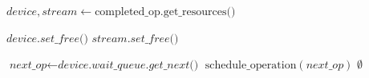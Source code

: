 \begin{algorithm}
\vspace{0.5cm}

\begin{algorithmic}[1]
    \State $\textit{device}, \textit{stream} \gets \text{completed\_op.get\_resources()}$
    
    \State $\textit{device.set\_free()}$
    \State $\textit{stream.set\_free()}$
    
        \State {}
        \State $\textit{next\_op} \gets \textit{device.wait\_queue.get\_next()}$
        \State \Return $\text{schedule\_operation}(\textit{next\_op})$
    \Else
        \State \Return $\emptyset$ 
    \EndIf
\EndProcedure
\end{algorithmic}
\end{algorithm}
